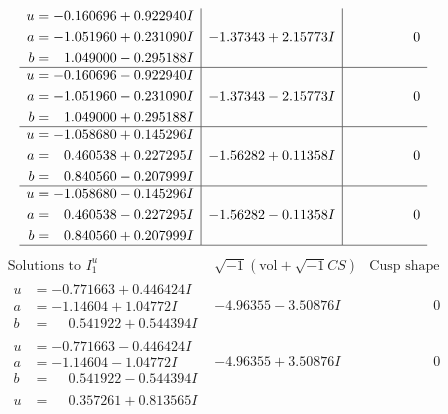 \documentclass[1p]{elsarticle_modified}
\theoremstyle{definition}
\newcommand{\I}{\sqrt{-1}}
\begin{document}
$$\begin{array}{c|c|c}
\begin{aligned}
u &= -0.160696 + 0.922940 I \\
a &= -1.051960 + 0.231090 I \\
b &= \phantom{-}1.049000 - 0.295188 I\end{aligned}
 & -1.37343 + 2.15773 I & \phantom{-0.000000 } 0 \\ \hline\begin{aligned}
u &= -0.160696 - 0.922940 I \\
a &= -1.051960 - 0.231090 I \\
b &= \phantom{-}1.049000 + 0.295188 I\end{aligned}
 & -1.37343 - 2.15773 I & \phantom{-0.000000 } 0 \\ \hline\begin{aligned}
u &= -1.058680 + 0.145296 I \\
a &= \phantom{-}0.460538 + 0.227295 I \\
b &= \phantom{-}0.840560 - 0.207999 I\end{aligned}
 & -1.56282 + 0.11358 I & \phantom{-0.000000 } 0 \\ \hline\begin{aligned}
u &= -1.058680 - 0.145296 I \\
a &= \phantom{-}0.460538 - 0.227295 I \\
b &= \phantom{-}0.840560 + 0.207999 I\end{aligned}
 & -1.56282 - 0.11358 I & \phantom{-0.000000 } 0\\
 \hline 
 \end{array}$$\newpage$$\begin{array}{c|c|c}  
\text{Solutions to }I^u_{1}& \I (\text{vol} + \sqrt{-1}CS) & \text{Cusp shape}\\
 \hline 
\begin{aligned}
u &= -0.771663 + 0.446424 I \\
a &= -1.14604 + 1.04772 I \\
b &= \phantom{-}0.541922 + 0.544394 I\end{aligned}
 & -4.96355 - 3.50876 I & \phantom{-0.000000 } 0 \\ \hline\begin{aligned}
u &= -0.771663 - 0.446424 I \\
a &= -1.14604 - 1.04772 I \\
b &= \phantom{-}0.541922 - 0.544394 I\end{aligned}
 & -4.96355 + 3.50876 I & \phantom{-0.000000 } 0 \\ \hline\begin{aligned}
u &= \phantom{-}0.357261 + 0.813565 I \\

\end{aligned}
\end{array}$$
\end{document}
